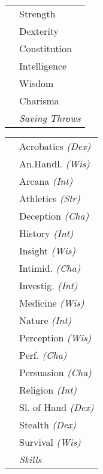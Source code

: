 \documentclass{article}
\begin{document}
\begin{minipage}{.3\textwidth}
\begin{minipage}{.58\textwidth}
\begin{tabularx}{\textwidth}{| L{.05} L{1.95} |}
      \hline
      &Strength\\
      &Dexterity\\
      &Constitution\\
      &Intelligence\\
      &Wisdom\\
      &Charisma\\
      &\textit{\footnotesize{Saving Throws}}\\\hline
    \end{tabularx}
    \begin{tabularx}{\textwidth}{| L{.05} L{1.95} |}
      \hline
      &\footnotesize{Acrobatics} \textit{\scriptsize{(Dex)}}\\
      &\footnotesize{An.Handl.} \textit{\scriptsize{(Wis)}}\\
      &\footnotesize{Arcana} \textit{\scriptsize{(Int)}}\\
      &\footnotesize{Athletics} \textit{\scriptsize{(Str)}}\\
      &\footnotesize{Deception} \textit{\scriptsize{(Cha)}}\\
      &\footnotesize{History} \textit{\scriptsize{(Int)}}\\
      &\footnotesize{Insight} \textit{\scriptsize{(Wis)}}\\
      &\footnotesize{Intimid.} \textit{\scriptsize{(Cha)}}\\
      &\footnotesize{Investig.} \textit{\scriptsize{(Int)}}\\
      &\footnotesize{Medicine} \textit{\scriptsize{(Wis)}}\\
      &\footnotesize{Nature} \textit{\scriptsize{(Int)}}\\
      &\footnotesize{Perception} \textit{\scriptsize{(Wis)}}\\
      &\footnotesize{Perf.} \textit{\scriptsize{(Cha)}}\\
      &\footnotesize{Persuasion} \textit{\scriptsize{(Cha)}}\\
      &\footnotesize{Religion} \textit{\scriptsize{(Int)}}\\
      &\footnotesize{Sl. of Hand} \textit{\scriptsize{(Dex)}}\\
      &\footnotesize{Stealth} \textit{\scriptsize{(Dex)}}\\
      &\footnotesize{Survival} \textit{\scriptsize{(Wis)}}\\
      &\textit{\footnotesize{Skills}}\\\hline
    \end{tabularx}
  \vspace{2em}

\end{minipage}
\end{minipage}
\end{document}
